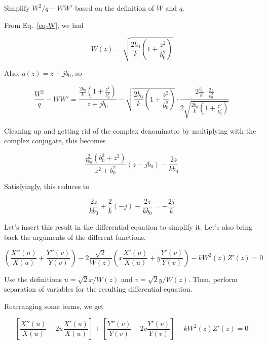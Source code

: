 \begin{cue}
Simplify $W^2/q - WW'$ based on the definition of $W$ and $q$. 
\end{cue}

From Eq.~\ref{eq-W}, we had

\begin{equation}
W(z)=\sqrt{\frac{2 b_0}{k} \left(1 + \frac{z^2}{b_0^2}\right)} 
\end{equation}

Also, $q(z)=z+jb_0$, so

\begin{equation}
\frac{W^2}{q} - WW' = \frac{\frac{2 b_0}{k} \left(1 + \frac{z^2}{b_0^2}\right)}{z+jb_0} - \sqrt{\frac{2 b_0}{k} \left(1 + \frac{z^2}{b_0^2}\right)} \cdot \frac{2\frac{b_0}{k} \cdot \frac{2z}{b_0^2}}{2\sqrt{\frac{2 b_0}{k} \left(1 + \frac{z^2}{b_0^2}\right)} }
\end{equation}

Cleaning up and getting rid of the complex denominator by multiplying with the complex conjugate, this becomes

\begin{equation}
\frac{\frac{2}{k b_0} \left(b_0^2 + z^2\right)}{z^2+b_0^2}(z-jb_0) - \frac{2z}{k b_0}
\end{equation}

Satisfyingly, this reduces to

\begin{equation}
\frac{2z}{k b_0}  + \frac{2}{k}(-j) - \frac{2z}{k b_0} = - \frac{2j}{k}
\end{equation}

Let's insert this result in the differential equation to simplify it. Let's also bring back the arguments of the different functions.

\begin{equation}
  \left(\frac{X''(u)}{X(u)}+\frac{Y''(v)}{Y(v)}\right)  
  - 2  \frac{\sqrt{2}}{W(z)}\left(x\frac{X'(u)}{X(u)}+y\frac{Y'(v)}{Y(v)}\right)
  -kW^2(z)Z'(z) = 0
  \end{equation} 

\begin{cue}
Use the definitions $u = \sqrt{2} x / W(z)$ and  $v = \sqrt{2} y / W(z)$. Then, perform separation of variables for the resulting differential equation. 
\end{cue}

Rearranging some terms, we get

\begin{equation}
\left[{\frac{X''(u)}{X(u)} - 2 u\frac{X'(u)}{X(u)}}\right] + 
\left[{\frac{Y''(v)}{Y(v)} - 2 v\frac{Y'(v)}{Y(v)}}\right] -kW^2(z)Z'(z) = 0
\end{equation} 

